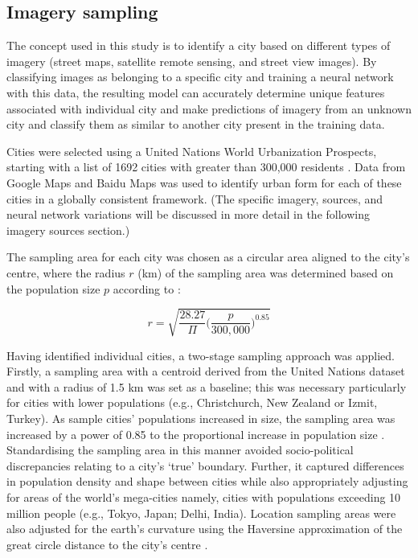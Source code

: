 \documentclass[sageh,times]{sagej}
\begin{document}
\subsection{Imagery sampling}\label{sec:methods2}

The concept used in this study is to identify a city based on different types of imagery (street maps, satellite remote sensing, and street view images). By classifying images as belonging to a specific city and training a neural network with this data, the resulting model can accurately determine unique features associated with individual city and make predictions of imagery from an unknown city and classify them as similar to another city present in the training data.

Cities were selected using a United Nations World Urbanization Prospects, starting with a list of 1692 cities with greater than 300,000 residents \citep{UN2014}. Data from Google Maps and Baidu Maps was used to identify urban form for each of these cities in a globally consistent framework. (The specific imagery, sources, and neural network variations will be discussed in more detail in the following imagery sources section.)

The sampling area for each city was chosen as a circular area aligned to the city's centre, where the radius $r$ (km) of the sampling area was determined based on the population size $p$ according to \cite{Barthelemy2016}:

\begin{equation}
r = \sqrt{ \frac{28.27}{\Pi} \bigg( \frac{p}{300,000}  \bigg)^{0.85} }
\end{equation}

Having identified individual cities, a two-stage sampling approach was applied. Firstly, a sampling area with a centroid derived from the United Nations dataset and with a radius of 1.5 km was set as a baseline; this was necessary particularly for cities with lower populations (e.g., Christchurch, New Zealand or Izmit, Turkey). As sample cities' populations increased in size, the sampling area was increased by a power of 0.85 to the proportional increase in population size \citep{Barthelemy2016}. Standardising the sampling area in this manner avoided socio-political discrepancies relating to a city's `true' boundary. Further, it captured differences in population density and shape between cities while also appropriately adjusting for areas of the world's mega-cities namely, cities with populations exceeding 10 million people (e.g., Tokyo, Japan;  Delhi, India). Location sampling areas were also adjusted for the earth's curvature using the Haversine approximation of the great circle distance to the city's centre \citep{Sinnott1984}. 
\end{document}
